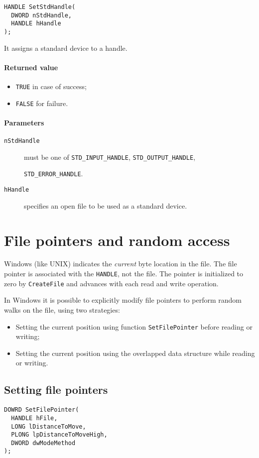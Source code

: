 \begin{verbatim}
HANDLE SetStdHandle(
  DWORD nStdHandle,
  HANDLE hHandle
);
\end{verbatim}

It assigns a standard device to a handle.

\paragraph{Returned value}
\begin{itemize}
\item \texttt{TRUE} in case of success;
\item \texttt{FALSE} for failure.
\end{itemize}

\paragraph{Parameters}
\begin{description}
\item [\texttt{nStdHandle}] must be one of \texttt{STD\_INPUT\_HANDLE}, \texttt{STD\_OUTPUT\_HANDLE},

\texttt{STD\_ERROR\_HANDLE}.
\item [\texttt{hHandle}] specifies an open file to be used as a standard device.
\end{description}

\section{File pointers and random access}
Windows (like UNIX) indicates the \emph{current} byte location in the file. The file pointer is associated with the \texttt{HANDLE}, not the file. The pointer is initialized to zero by \texttt{CreateFile} and advances with each read and write operation.

In Windows it is possible to explicitly modify file pointers to perform random walks on the file, using two strategies:
\begin{itemize}
\item Setting the current position using function \texttt{SetFilePointer} before reading or writing;
\item Setting the current position using the overlapped data structure while reading or writing.
\end{itemize}

\subsection{Setting file pointers}
\begin{verbatim}
DOWRD SetFilePointer(
  HANDLE hFile,
  LONG lDistanceToMove,
  PLONG lpDistanceToMoveHigh,
  DWORD dwModeMethod
);
\end{verbatim}

